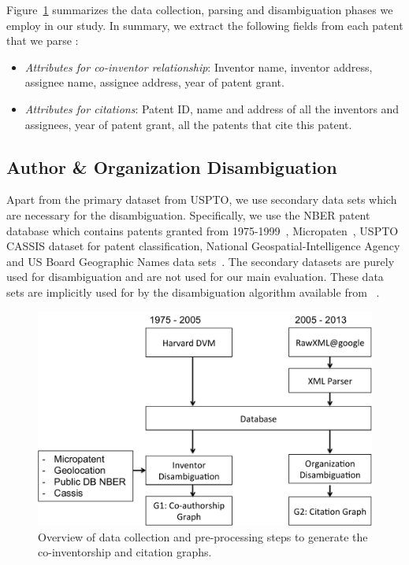 Figure~\ref{process} summarizes the data collection, parsing and disambiguation phases we employ in our study.
In summary, we extract the following fields from each patent that we parse :

\begin{itemize}
\item {\em Attributes for co-inventor relationship}:
Inventor name, inventor address, assignee name, assignee address, year of patent grant.

\item {\em Attributes for citations}:
Patent ID, name and address of all the inventors and assignees, year of patent grant, all the patents that cite this patent.
\end{itemize}


\subsection{Author \& Organization Disambiguation}

Apart from the primary dataset from USPTO, we use secondary data sets which are necessary for the disambiguation. Specifically, we use the NBER patent database which contains patents granted from 1975-1999~\cite{NBER}, Micropaten~\cite{micropatent}, USPTO CASSIS dataset for patent classification, National Geospatial-Intelligence Agency and US Board Geographic Names data sets~\cite{geocoding, geotable}. The secondary datasets are purely used for disambiguation and are not used for our main evaluation. These data sets are implicitly used for by the disambiguation algorithm available from ~\cite{disambiguation}.

\begin{figure}[H]
		  \centering	
          \includegraphics[scale=0.4]{../figures/process.pdf}
          \caption{Overview of data collection and pre-processing steps to generate the co-inventorship and citation graphs.}
          \label{process}

\end{figure}



